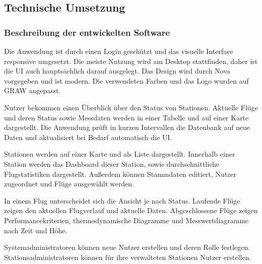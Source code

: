 \subsection{Technische Umsetzung}

\subsubsection{Beschreibung der entwickelten Software}
Die Anwendung ist durch einen Login geschützt und das visuelle Interface responsive umgesetzt.
Die meiste Nutzung wird am Desktop stattfinden, daher ist die UI auch hauptsächlich darauf ausgelegt.
Das Design wird durch Nova vorgegeben und ist modern.
Die verwendeten Farben und das Logo wurden auf GRAW angepasst.

Nutzer bekommen einen Überblick über den Status von Stationen.
Aktuelle Flüge und deren Status sowie Messdaten werden in einer Tabelle und auf einer Karte dargestellt.
Die Anwendung prüft in kurzen Intervallen die Datenbank auf neue Daten und aktualisiert bei Bedarf automatisch die UI.

Stationen werden auf einer Karte und als Liste dargestellt.
Innerhalb einer Station werden das Dashboard dieser Station, sowie durchschnittliche Flugstatistiken dargestellt.
Außerdem können Stammdaten editiert, Nutzer zugeordnet und Flüge ausgewählt werden.

In einem Flug unterscheidet sich die Ansicht je nach Status.
Laufende Flüge zeigen den aktuellen Flugverlauf und aktuelle Daten.
Abgeschlossene Flüge zeigen Performancekriterien, thermodynamische Diagramme und Messwertdiagramme nach Zeit und Höhe.

Systemadministratoren können neue Nutzer erstellen und deren Rolle festlegen.
Stationsadministratoren können für ihre verwalteten Stationen Nutzer erstellen.

\newpage

